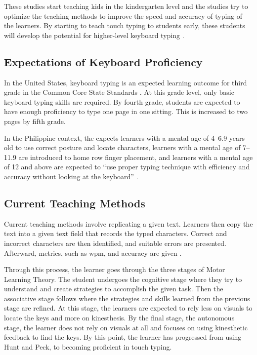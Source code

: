 \documentclass{report}
\begin{document}
These studies start teaching kids in the kindergarten level and the studies try
to optimize the teaching methods to improve the speed and accuracy of typing of
the learners. By starting to teach touch typing to students early, these
students will develop the potential for higher-level keyboard typing
\parencite{donica2018}.

\subsection{Expectations of Keyboard Proficiency}

In the United States, keyboard typing is an expected learning outcome for third
grade in the Common Core State Standards \parencite{ccs}. At this grade level,
only basic keyboard typing skills are required. By fourth grade, students are
expected to have enough proficiency to type one page in one sitting. This is
increased to two pages by fifth grade.

In the Philippine context, the \citeauthor{deped} expects learners with a mental
age of 4--6.9 years old to use correct posture and locate characters, learners
with a mental age of 7--11.9 are introduced to home row finger placement, and
learners with a mental age of 12 and above are expected to ``use proper typing
technique with efficiency and accuracy without looking at the keyboard''
\parencite{deped}.

\subsection{Current Teaching Methods}

Current teaching methods involve replicating a given text. Learners then copy
the text into a given text field that records the typed characters. Correct and
incorrect characters are then identified, and suitable errors are presented.
Afterward, metrics, such as \ac{wpm}, and accuracy are given
\parencite{bartnik2021, typeracer}.

Through this process, the learner goes through the three stages of Motor
Learning Theory. The student undergoes the cognitive stage where they try to
understand and create strategies to accomplish the given task. Then the
associative stage follows where the strategies and skills learned from the
previous stage are refined. At this stage, the learners are expected to rely less
on visuals to locate the keys and more on kinesthesis. By the final stage, the
autonomous stage, the learner does not rely on visuals at all and focuses on
using kinesthetic feedback to find the keys. By this point, the learner has
progressed from using Hunt and Peck, to becoming proficient in touch typing.
\parencite{donica2018}
\end{document}
